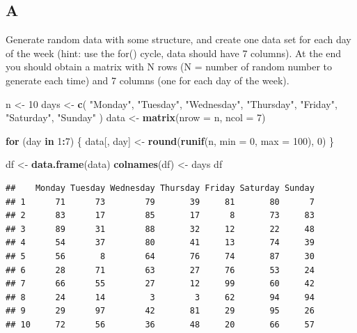 \documentclass[
]{article}
\newenvironment{Shaded}{\begin{snugshade}}{\end{snugshade}}
\newcommand{\AttributeTok}[1]{\textcolor[rgb]{0.13,0.29,0.53}{#1}}
\newcommand{\ControlFlowTok}[1]{\textcolor[rgb]{0.13,0.29,0.53}{\textbf{#1}}}
\newcommand{\DecValTok}[1]{\textcolor[rgb]{0.00,0.00,0.81}{#1}}
\newcommand{\FunctionTok}[1]{\textcolor[rgb]{0.13,0.29,0.53}{\textbf{#1}}}
\newcommand{\NormalTok}[1]{#1}
\newcommand{\OtherTok}[1]{\textcolor[rgb]{0.56,0.35,0.01}{#1}}
\newcommand{\SpecialCharTok}[1]{\textcolor[rgb]{0.81,0.36,0.00}{\textbf{#1}}}
\newcommand{\StringTok}[1]{\textcolor[rgb]{0.31,0.60,0.02}{#1}}
\begin{document}
\hypertarget{a-3}{%
\subsection{A}\label{a-3}}

Generate random data with some structure, and create one data set for
each day of the week (hint: use the for() cycle, data should have 7
columns). At the end you should obtain a matrix with N rows (N = number
of random number to generate each time) and 7 columns (one for each day
of the week).

\begin{Shaded}
\begin{Highlighting}[]
\NormalTok{n }\OtherTok{\textless{}{-}} \DecValTok{10}
\NormalTok{days }\OtherTok{\textless{}{-}} \FunctionTok{c}\NormalTok{(}
  \StringTok{"Monday"}\NormalTok{,}
  \StringTok{"Tuesday"}\NormalTok{,}
  \StringTok{"Wednesday"}\NormalTok{,}
  \StringTok{"Thursday"}\NormalTok{,}
  \StringTok{"Friday"}\NormalTok{,}
  \StringTok{"Saturday"}\NormalTok{,}
  \StringTok{"Sunday"}
\NormalTok{)}
\NormalTok{data }\OtherTok{\textless{}{-}} \FunctionTok{matrix}\NormalTok{(}\AttributeTok{nrow =}\NormalTok{ n, }\AttributeTok{ncol =} \DecValTok{7}\NormalTok{)}

\ControlFlowTok{for}\NormalTok{ (day }\ControlFlowTok{in} \DecValTok{1}\SpecialCharTok{:}\DecValTok{7}\NormalTok{) \{}
\NormalTok{  data[, day] }\OtherTok{\textless{}{-}} \FunctionTok{round}\NormalTok{(}\FunctionTok{runif}\NormalTok{(n, }\AttributeTok{min =} \DecValTok{0}\NormalTok{, }\AttributeTok{max =} \DecValTok{100}\NormalTok{), }\DecValTok{0}\NormalTok{)}
\NormalTok{\}}

\NormalTok{df }\OtherTok{\textless{}{-}} \FunctionTok{data.frame}\NormalTok{(data)}
\FunctionTok{colnames}\NormalTok{(df) }\OtherTok{\textless{}{-}}\NormalTok{ days}
\NormalTok{df}
\end{Highlighting}
\end{Shaded}

\begin{verbatim}
##    Monday Tuesday Wednesday Thursday Friday Saturday Sunday
## 1      71      73        79       39     81       80      7
## 2      83      17        85       17      8       73     83
## 3      89      31        88       32     12       22     48
## 4      54      37        80       41     13       74     39
## 5      56       8        64       76     74       87     30
## 6      28      71        63       27     76       53     24
## 7      66      55        27       12     99       60     42
## 8      24      14         3        3     62       94     94
## 9      29      97        42       81     29       95     26
## 10     72      56        36       48     20       66     57
\end{verbatim}
\end{document}
